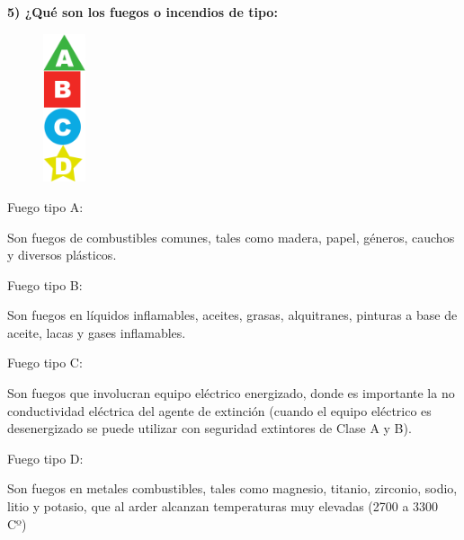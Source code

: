 \documentclass[letterpaper,11pt]{article}
\begin{document}
\textbf{5) ¿Qué son los fuegos o incendios de tipo:}

\begin{figure}
	\centering
	\includegraphics[width=0.111\textwidth]{ABCD.png}
\end{figure}

Fuego tipo A:

Son fuegos de combustibles comunes, tales como madera, papel, géneros, cauchos y diversos plásticos.


Fuego tipo B:

Son fuegos en líquidos inflamables, aceites, grasas, alquitranes, pinturas a base de aceite, lacas y gases inflamables.



Fuego tipo C:

Son fuegos que involucran equipo eléctrico energizado, donde es importante la no conductividad eléctrica del agente de extinción (cuando el equipo eléctrico es desenergizado se puede utilizar con seguridad extintores de Clase A y B).


Fuego tipo D:

Son fuegos en metales combustibles, tales como magnesio, titanio, zirconio, sodio, litio y potasio, que al arder alcanzan temperaturas muy elevadas (2700 a 3300 Cº)
\end{document}

